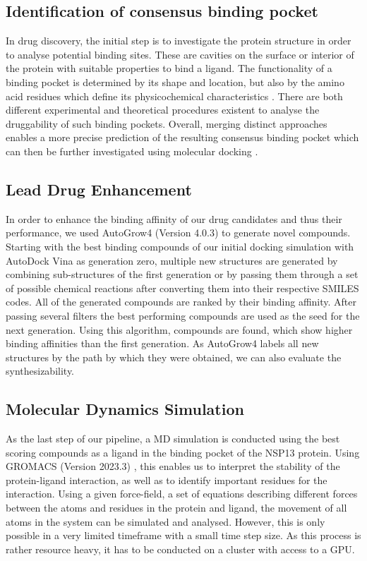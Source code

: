 \documentclass[11pt, letterpaper, titlepage]{article}
\renewcommand{\cite}{\parencite}
\begin{document}
\subsection{Identification of consensus binding pocket}
In drug discovery, the initial step is to investigate the protein structure in order to analyse potential binding sites. These are cavities on the surface or interior of the protein with suitable properties to bind a ligand. The functionality of a binding pocket is determined by its shape and location, but also by the amino acid residues which define its physicochemical characteristics \cite{Stank_2016}. 
There are both different experimental and theoretical procedures existent to analyse the druggability of such binding pockets. Overall, merging distinct approaches enables a more precise prediction of the resulting consensus binding pocket which can then be further investigated using molecular docking \cite{Ricci_2022}. 

\subsection{Lead Drug Enhancement}
In order to enhance the binding affinity of our drug candidates and thus their performance, we used AutoGrow4 (Version 4.0.3) \cite{package_Autogrow4} to generate novel compounds. Starting with the best binding compounds of our initial docking simulation with AutoDock Vina as generation zero, multiple new structures are generated by combining sub-structures of the first generation or by passing them through a set of possible chemical reactions after converting them into their respective SMILES codes. All of the generated compounds are ranked by their binding affinity. After passing several filters the best performing compounds are used as the seed for the next generation. Using this algorithm, compounds are found, which show higher binding affinities than the first generation. As AutoGrow4 labels all new structures by the path by which they were obtained, we can also evaluate the synthesizability.  

\subsection{Molecular Dynamics Simulation}
As the last step of our pipeline, a MD simulation is conducted using the best scoring compounds as a ligand in the binding pocket of the NSP13 protein. Using GROMACS (Version 2023.3) \cite{package_GROMACS}, this enables us to interpret the stability of the protein-ligand interaction, as well as to identify important residues for the interaction. Using a given force-field, a set of equations describing different forces between the atoms and residues in the protein and ligand, the movement of all atoms in the system can be simulated and analysed. However, this is only possible in a very limited timeframe with a small time step size. As this process is rather resource heavy, it has to be conducted on a cluster with access to a GPU. 
\end{document}
